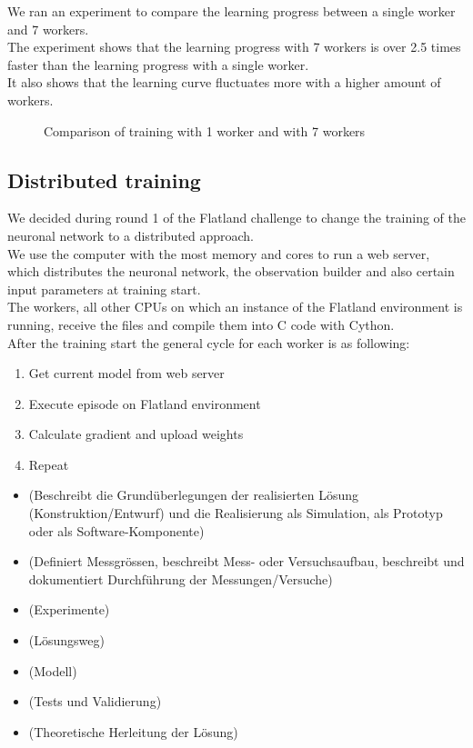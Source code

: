 We ran an experiment to compare the learning progress between a single worker and 7 workers.\\
The experiment shows that the learning progress with 7 workers is over 2.5 times faster than the learning progress with a single worker.\\
It also shows that the learning curve fluctuates more with a higher amount of workers.\\

\begin{figure}
	\begin{center}
		
	\end{center}
	\caption{Comparison of training with 1 worker and with 7 workers}
	\label{chart:singlemany_comparison}
\end{figure}

\subsection*{Distributed training}
We decided during round 1 of the Flatland challenge to change the training of the neuronal network to a distributed approach. \\
We use the computer with the most memory and cores to run a web server, which distributes the neuronal network, the observation builder and also certain input parameters at training start. \\
The workers, all other CPUs on which an instance of the Flatland environment is running, receive the files and compile them into C code with Cython.\\
After the training start the general cycle for each worker is as following:

\begin{enumerate}
	\item Get current model from web server
	\item Execute episode on Flatland environment
	\item Calculate gradient and upload weights
	\item Repeat
\end{enumerate}





\begin{itemize}
\item (Beschreibt die Grundüberlegungen der realisierten Lösung (Konstruktion/Entwurf) und die Realisierung als Simulation, als Prototyp oder als Software-Komponente)
\item (Definiert Messgrössen, beschreibt Mess- oder Versuchsaufbau, beschreibt und dokumentiert Durchführung der Messungen/Versuche)
\item (Experimente)
\item (Lösungsweg)
\item (Modell)
\item (Tests und Validierung)
\item (Theoretische Herleitung der Lösung)
\end{itemize}

